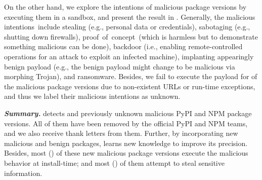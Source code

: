 On the other hand, we explore the intentions of malicious package versions by executing them in a sandbox, and present the result in . Generally, the malicious intentions~include stealing (e.g., personal data or credentials), sabotaging (e.g., shutting down firewalls), proof~of~concept~(which is harmless but to demonstrate something malicious can be done), backdoor (i.e., enabling remote-controlled operations for an attack to exploit an infected machine), implanting appearingly benign payload (e.g., the benign payload might change to be malicious via morphing Trojan), and ransomware. Besides, we fail to execute the payload for  of the malicious package versions due to non-existent URLs or run-time exceptions, and thus we label their malicious intentions as unknown.

\textbf{\textit{Summary.}} \tool detects  and  previously unknown malicious PyPI and NPM package versions. All of them have been removed by the official PyPI and NPM teams, and we also receive  thank letters from them. Further, by incorporating new malicious and benign packages, \tool learns new knowledge to improve its precision. Besides, most () of these new malicious package versions execute the malicious behavior at install-time; and most () of them attempt to steal sensitive information.



